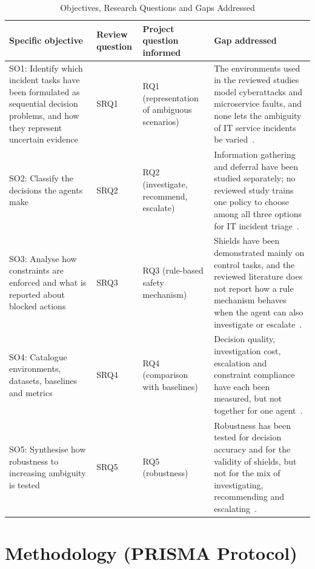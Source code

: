 \documentclass[journal]{IEEEtran}
\begin{document}
\begin{table}[!t]
\centering
\caption{Objectives, Research Questions and Gaps Addressed}
\label{tab:objectives}
\footnotesize
\begin{tabularx}{\textwidth}{@{}p{3.6cm}p{1.1cm}p{2.3cm}L@{}}
\toprule
Specific objective & Review question & Project question informed & Gap addressed \\
\midrule
SO1: Identify which incident tasks have been formulated as sequential decision problems, and how they represent uncertain evidence & SRQ1 & RQ1 (representation of ambiguous scenarios) & The environments used in the reviewed studies model cyberattacks and microservice faults, and none lets the ambiguity of IT service incidents be varied~\cite{hammar2025,dunsin2025,wang2023hrlhf}. \\
SO2: Classify the decisions the agents make & SRQ2 & RQ2 (investigate, recommend, escalate) & Information gathering and deferral have been studied separately; no reviewed study trains one policy to choose among all three options for IT incident triage~\cite{janisch2019,kim2025,madras2018,joshi2023}. \\
SO3: Analyse how constraints are enforced and what is reported about blocked actions & SRQ3 & RQ3 (rule-based safety mechanism) & Shields have been demonstrated mainly on control tasks, and the reviewed literature does not report how a rule mechanism behaves when the agent can also investigate or escalate~\cite{alshiekh2018,konighofer2025,alauthman2026}. \\
SO4: Catalogue environments, datasets, baselines and metrics & SRQ4 & RQ4 (comparison with baselines) & Decision quality, investigation cost, escalation and constraint compliance have each been measured, but not together for one agent~\cite{remil2024,levy2026,pacella2026}. \\
SO5: Synthesise how robustness to increasing ambiguity is tested & SRQ5 & RQ5 (robustness) & Robustness has been tested for decision accuracy and for the validity of shields, but not for the mix of investigating, recommending and escalating~\cite{kim2025,hammar2025,hamel2026}. \\
\bottomrule
\end{tabularx}
\end{table}

\section{Methodology (PRISMA Protocol)}
\end{document}
